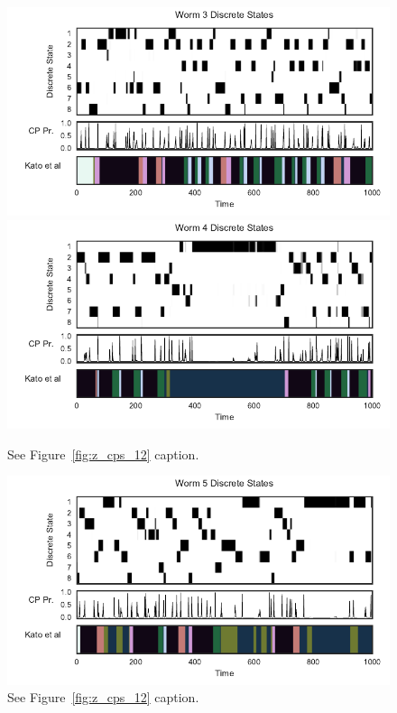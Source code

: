 \documentclass{article}
\begin{document}
\begin{figure}[h]
\centering%
\includegraphics[width=5.5in]{figures/arhmm/z_cps_worm2.pdf}
\includegraphics[width=5.5in]{figures/arhmm/z_cps_worm3.pdf}
\caption{See Figure~\ref{fig:z_cps_12} caption.}
\label{fig:z_cps_34}
\end{figure}

\begin{figure}[h]
\centering
\includegraphics[width=5.5in]{figures/arhmm/z_cps_worm4.pdf}
\caption{See Figure~\ref{fig:z_cps_12} caption.}
\label{fig:z_cps_5}
\end{figure}
\end{document}
